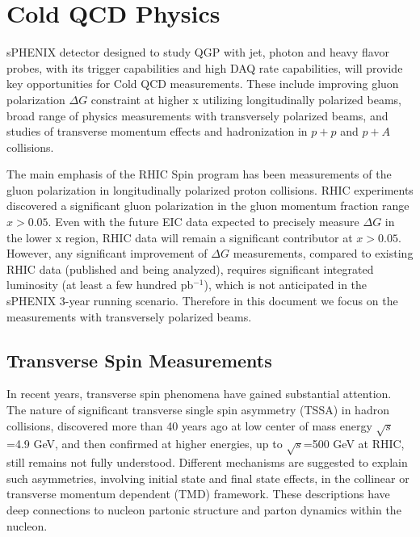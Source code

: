  





\section{Cold QCD Physics}
\label{sec:ColdQCD}

sPHENIX detector designed to study QGP with jet, photon and heavy flavor probes, with its trigger capabilities and high DAQ rate capabilities, will provide key opportunities for Cold QCD measurements. These include improving gluon polarization $\Delta G$ constraint at higher x utilizing longitudinally polarized beams, broad range of physics measurements with transversely polarized beams, and studies of transverse momentum effects and hadronization in $p+p$ and $p+A$ collisions.

The main emphasis of the RHIC Spin program has been measurements of the gluon polarization in longitudinally polarized proton collisions. RHIC experiments discovered a significant gluon polarization in the gluon momentum fraction range $x>0.05$. Even with the future EIC data expected to precisely measure $\Delta G$ in the lower x region, RHIC data will remain a significant contributor at $x>0.05$. However, any significant improvement of $\Delta G$ measurements, compared to existing RHIC data (published and being analyzed), requires significant integrated luminosity (at least a few hundred pb$^{-1}$), which is not anticipated in the sPHENIX 3-year running scenario. Therefore in this document we focus on the measurements with transversely polarized beams.

\subsection {Transverse Spin Measurements}

In recent years, transverse spin phenomena have gained substantial attention. The nature of significant transverse single spin asymmetry (TSSA) in hadron collisions, discovered more than 40 years ago at low center of mass energy $\sqrt{s}$=4.9 GeV, and then confirmed at higher energies, up to $\sqrt{s}$=500 GeV at RHIC, still remains not fully understood. Different mechanisms are suggested to explain such asymmetries, involving initial state and final state effects, in the collinear or transverse momentum dependent (TMD) framework. These descriptions have deep connections to nucleon partonic structure and parton dynamics within the nucleon.

